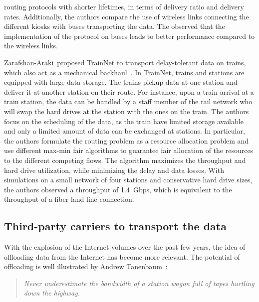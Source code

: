 routing protocols with shorter lifetimes, in terms of delivery ratio and delivery rates. Additionally, the authors compare the use of wireless links connecting the different kiosks with buses transporting the data. The observed that the implementation of the protocol on buses leads to better performance compared to the wireless links. 

Zarafshan-Araki~\etal proposed TrainNet to transport delay-tolerant data on trains, which also act as a mechanical backhaul~\cite{zarafshan2010trainnet}. In TrainNet, trains and stations are equipped with large data storage. The trains pickup data at one station and deliver it at another station on their route. For instance, upon a train arrival at a train station, the data can be handled by a staff member of the rail network who will swap the hard drives at the station with the ones on the train. The authors focus on the scheduling of the data, as the train have limited storage available and only a limited amount of data can be exchanged at stations. In particular, the authors formulate the routing problem as a resource allocation problem and use different max-min fair algorithms to guarantee fair allocation of the resources to the different competing flows. The algorithm maximizes the throughput and hard drive utilization, while minimizing the delay and data losses. With simulations on a small network of four stations and conservative hard drive sizes, the authors observed a throughput of 1.4~Gbps, which is equivalent to the throughput of a fiber land line connection.

\subsection{Third-party carriers to transport the data}

With the explosion of the Internet volumes over the past few years, the idea of offloading data from the Internet has become more relevant. The potential of offloading is well illustrated by Andrew Tanenbaum~\cite{tanenbaum2003computer}:
\begin{quote}
    \textit{Never underestimate the bandwidth of a station wagon full of tapes hurtling down the highway.}
\end{quote}

